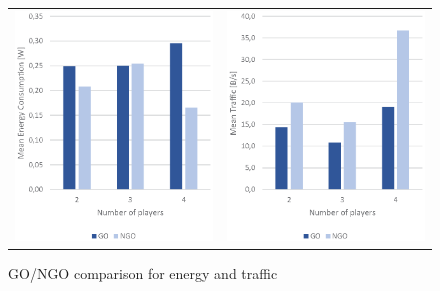 \begin{figure}[H]
  \centering
  \begin{tabular}{@{}c@{}c}
      \includegraphics[width=.5\columnwidth]{img/energy.eps}
      \label{fig:energy}
    &
    \includegraphics[width=.5\columnwidth]{img/traffic.eps}
    \label{fig:traffic}
  \end{tabular}
  \caption{GO/NGO comparison for energy and traffic}\label{fig:comparison}
\end{figure}


